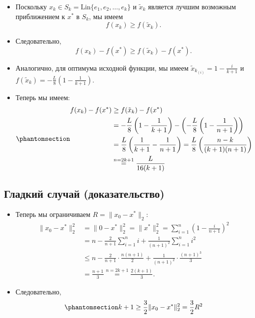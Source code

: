 \documentclass[
  russian,
  letterpaper,
  DIV=11,
  numbers=noendperiod]{scrartcl}
\providecommand{\tightlist}{%
  \setlength{\itemsep}{0pt}\setlength{\parskip}{0pt}}
\begin{document}
\begin{itemize}
\tightlist
\item
  Поскольку \(x_k\in S_k = \text{Lin}\{e_1, e_2, \ldots, e_{k}\}\) и
  \(\tilde{x}_k\) является лучшим возможным приближением к \(x^*\) в
  \(S_k\), мы имеем \[
    f(x_k)\ge f(\tilde{x}_k).
    \]
\item
  Следовательно, \[
    f(x_k)-f(x^*)\ge f(\tilde{x}_k)-f(x^*).
    \]
\item
  Аналогично, для оптимума исходной функции, мы имеем
  \(\tilde{x}_{k_{(i)}} = 1 - \frac{i}{k+1}\) и
  \(f(\tilde{x}_k) = -\frac{L}{8} \left(1 - \frac{1}{k+1}\right)\).
\item
  Теперь мы имеем: \begin{equation}\phantomsection\label{eq-lb1}{
    \begin{aligned}
    f(x_k)-f(x^*) &\ge f(\tilde{x}_k)-f(x^*) \\
    &= -\frac{L}{8} \left(1 - \frac{1}{k+1}\right) - \left(-\frac{L}{8} \left(1 - \frac{1}{n+1}\right)\right) \\
    &= \frac{L}{8} \left(\frac{1}{k+1} - \frac{1}{n+1}\right) = \frac{L}{8} \left(\frac{n-k}{(k+1)(n+1)}\right) \\
    &\overset{n = 2k+1}{=} \frac{L }{16(k+1)}
    \end{aligned}
    }\end{equation}
\end{itemize}

\subsection{Гладкий случай
(доказательство)}\label{ux433ux43bux430ux434ux43aux438ux439-ux441ux43bux443ux447ux430ux439-ux434ux43eux43aux430ux437ux430ux442ux435ux43bux44cux441ux442ux432ux43e-2}

\begin{itemize}
\item
  Теперь мы ограничиваем \(R = \|x_0 - x^*\|_2\): \[
    \begin{aligned}
    \|x_0 - x^*\|_2^2 &= \|0 - x^*\|_2^2 = \|x^*\|_2^2 = \sum_{i=1}^n \left( 1 - \frac{i}{n+1} \right)^2 \\
    &= n - \frac{2}{n+1} \sum_{i=1}^{n} i + \frac{1}{(n+1)^2} \sum_{i=1}^{n} i^2 \\
    &\leq n - \frac{2}{n+1} \cdot \frac{n(n+1)}{2} + \frac{1}{(n+1)^2} \cdot \frac{(n+1)^3}{3} \\
    &= \frac{n+1}{3} \overset{n = 2k+1}{=} \frac{2(k+1)}{3}.
    \end{aligned}
    \]
\item
  Следовательно, \begin{equation}\phantomsection\label{eq-lb2}{
    k+1 \geq \frac{3}{2}\|x_0 - x^*\|_2^2 = \frac32 R^2
    }\end{equation}
\end{itemize}
\end{document}
